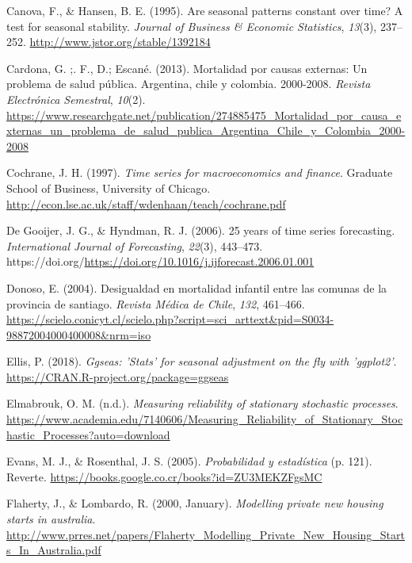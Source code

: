 \documentclass[
]{article}
\newlength{\cslhangindent}
\newlength{\cslentryspacingunit} %
\newenvironment{CSLReferences}[2] %
 {%
  \setlength{\parindent}{0pt}
  \ifodd #1
  \let\oldpar\par
  \def\par{\hangindent=\cslhangindent\oldpar}
  \fi
  \setlength{\parskip}{#2\cslentryspacingunit}
 }%
 {}
\begin{document}
\begin{CSLReferences}{1}{0}
\leavevmode{}%
Canova, F., \& Hansen, B. E. (1995). Are seasonal patterns constant over
time? A test for seasonal stability. \emph{Journal of Business \&
Economic Statistics}, \emph{13}(3), 237--252.
\url{http://www.jstor.org/stable/1392184}

\leavevmode{}%
Cardona, G. ;. F., D.; Escané. (2013). Mortalidad por causas externas:
Un problema de salud pública. Argentina, chile y colombia. 2000-2008.
\emph{Revista Electrónica Semestral}, \emph{10}(2).
\url{https://www.researchgate.net/publication/274885475_Mortalidad_por_causa_externas_un_problema_de_salud_publica_Argentina_Chile_y_Colombia_2000-2008}

\leavevmode{}%
Cochrane, J. H. (1997). \emph{Time series for macroeconomics and
finance}. Graduate School of Business, University of Chicago.
\url{http://econ.lse.ac.uk/staff/wdenhaan/teach/cochrane.pdf}

\leavevmode{}%
De Gooijer, J. G., \& Hyndman, R. J. (2006). 25 years of time series
forecasting. \emph{International Journal of Forecasting}, \emph{22}(3),
443--473.
https://doi.org/\url{https://doi.org/10.1016/j.ijforecast.2006.01.001}

\leavevmode{}%
Donoso, E. (2004). Desigualdad en mortalidad infantil entre las comunas
de la provincia de santiago. \emph{Revista Médica de Chile}, \emph{132},
461--466.
\url{https://scielo.conicyt.cl/scielo.php?script=sci_arttext\&pid=S0034-98872004000400008\&nrm=iso}

\leavevmode{}%
Ellis, P. (2018). \emph{Ggseas: 'Stats' for seasonal adjustment on the
fly with 'ggplot2'}. \url{https://CRAN.R-project.org/package=ggseas}

\leavevmode{}%
Elmabrouk, O. M. (n.d.). \emph{Measuring reliability of stationary
stochastic processes}.
\url{https://www.academia.edu/7140606/Measuring_Reliability_of_Stationary_Stochastic_Processes?auto=download}

\leavevmode{}%
Evans, M. J., \& Rosenthal, J. S. (2005). \emph{Probabilidad y
estadística} (p. 121). Reverte.
\url{https://books.google.co.cr/books?id=ZU3MEKZFgsMC}

\leavevmode{}%
Flaherty, J., \& Lombardo, R. (2000, January). \emph{Modelling private
new housing starts in australia}.
\url{http://www.prres.net/papers/Flaherty_Modelling_Private_New_Housing_Starts_In_Australia.pdf}


\end{CSLReferences}
\end{document}
